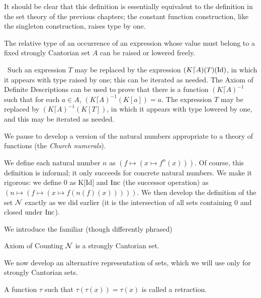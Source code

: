 It should be clear that this definition is essentially equivalent to
the definition in the set theory of the previous chapters; the
constant function construction, like the
singleton construction, 
raises type by one.

\begin{thm}
 The relative type of an occurrence of an expression whose
 value must belong to a fixed strongly Cantorian set $A$ can be raised
 or lowered freely.
\end{thm}

\preuve\ Such an expression $T$ may be replaced by the expression
$(K\lceil A)(T)(\mathop{\mathrm{Id}})$, in which it appears with type
raised by one; this can be 
iterated as needed.  The Axiom of Definite Descriptions can be used to
prove that there is a function $(K\lceil A)^{-1}$ such that for each
$a \in A$, $(K\lceil A)^{-1}(K[a]) = a$.  The expression $T$ may be replaced
by $(K\lceil A)^{-1}(K[T])$, in which it appears with type lowered by
one, and this may be iterated as needed.
\finpreuve

We pause to develop a version of the natural numbers
appropriate to a theory of functions (the {\itshape Church
numerals\/}).

\begin{definition}
 We define each natural number $n$ as $(f \mapsto (x
 \mapsto f^n(x)))$.  Of course, this definition is informal; it only
 succeeds for concrete natural numbers.  We make it rigorous: we define
 0 as K$[$Id$]$ and $\mathop{\mathrm{Inc}}$ (the successor
 operation) as $(n \mapsto (f \mapsto (x \mapsto f(n(f)(x)))))$.  We then
 develop the definition of the set $\cal N$ exactly as we did earlier (it is
 the intersection of all sets containing 0 and closed
 under $\mathop{\mathrm{Inc}}$).
\end{definition}

We introduce the familiar (though differently phrased)

\begin{axiom}{Axiom of Counting}
  $\cal N$ is a strongly Cantorian set.
\end{axiom}

We now develop an alternative representation of sets, which we will
use only for strongly Cantorian sets.

\begin{definition}
 A function $\tau$ such that $\tau(\tau(x)) =
 \tau(x)$ is called a {\upshape retraction}.
\end{definition}

